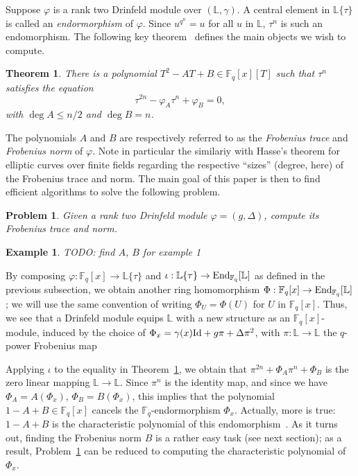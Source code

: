 \documentclass[sigconf]{acmart}
\newtheorem{theorem}{Theorem}
\newtheorem{example}{Example}
\newtheorem{problem}{Problem}
\newcommand{\F}{\mathbb{F}}
\renewcommand{\L}{\mathbb{L}}
\newcommand{\ang}[1]{\{#1\}}
\begin{document}
Suppose $\varphi$ is a rank two Drinfeld module over $(\L,\gamma)$. A
central element in $\L\ang{\tau}$ is called an {\em endormorphism} of
$\varphi$. Since $u^{q^n} = u$ for all $u$ in $\L$, $\tau^n$ is such
an endomorphism. The following key theorem~\cite{GEKELE1991187}
defines the main objects we wish to compute.
\begin{theorem}\label{charpoly}
  There is a polynomial $T^2 -AT + B \in \F_q[x][T]$ such that
  $\tau^n$ satisfies the  equation
  \begin{equation} \tau^{2n} - \varphi_A \tau^n + \varphi_B = 0,\end{equation}
  with $\deg A \le n/2$ and $\deg B=n$.
\end{theorem}
The polynomials $A$ and $B$ are respectively referred to as the
\textit{Frobenius trace} and \textit{Frobenius norm} of $\varphi$.
Note in particular the similariy with Hasse's theorem for elliptic
curves over finite fields regarding the respective ``sizes'' (degree,
here) of the Frobenius trace and norm.  The main goal of this paper is
then to find efficient algorithms to solve the following problem.
\begin{problem}\label{pb1}
  Given a rank two Drinfeld module $\varphi = (g,\Delta)$, compute its
  Frobenius trace and norm.
\end{problem}

\begin{example}
TODO: find $A$, $B$ for example 1
\end{example}

By composing $\varphi: \F_q[x]\to \L\ang{\tau}$ and
$\iota:\L\ang{\tau} \to {\rm End}_{\F_q}[\L]$ as defined in the
previous subsection, we obtain another ring homomorphism $\Phi:
\F_q[x]\to {\rm End}_{\F_q}[\L]$; we will use the same convention of
writing $\Phi_U=\Phi(U)$ for $U$ in $\F_q[x]$. Thus, we see that a
Drinfeld module equips $\L$ with a new structure as an
$\F_q[x]$-module, induced by the choice of $\Phi_x = \gamma(x) {\rm
  Id} + g \pi + \Delta \pi^2$, with $\pi:\L \to \L$ the $q$-power Frobenius map

Applying $\iota$ to the equality in Theorem~\ref{charpoly}, we obtain
that $\pi^{2n} + \Phi_A \pi^n + \Phi_B$ is the zero linear mapping $\L
\to \L$. Since $\pi^{n}$ is the identity map, and since we have
$\Phi_A = A(\Phi_x)$, $\Phi_B = B(\Phi_x)$, this implies that the
polynomial $1-A+B \in \F_q[x]$ cancels the $\F_q$-endormorphism
$\Phi_x$. Actually, more is true: $1-A+B$ is the characteristic
polynomial of this endomorphism~\cite[Th.~5.1]{GEKELE1991187}.  As it
turns out, finding the Frobenius norm $B$ is a rather easy task (see
next section); as a result, Problem~\ref{pb1} can be reduced to
computing the characteristic polynomial of $\Phi_x$.
\end{document}

